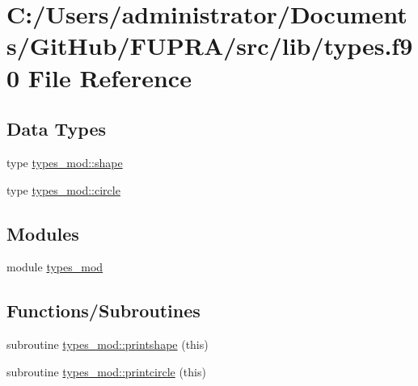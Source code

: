 \hypertarget{types_8f90}{}\section{C\+:/\+Users/administrator/\+Documents/\+Git\+Hub/\+F\+U\+P\+R\+A/src/lib/types.f90 File Reference}
\label{types_8f90}
\subsection*{Data Types}
\begin{DoxyCompactItemize}
\item 
type \mbox{\hyperlink{structtypes__mod_1_1shape}{types\+\_\+mod\+::shape}}
\item 
type \mbox{\hyperlink{structtypes__mod_1_1circle}{types\+\_\+mod\+::circle}}
\end{DoxyCompactItemize}
\subsection*{Modules}
\begin{DoxyCompactItemize}
\item 
module \mbox{\hyperlink{namespacetypes__mod}{types\+\_\+mod}}
\end{DoxyCompactItemize}
\subsection*{Functions/\+Subroutines}
\begin{DoxyCompactItemize}
\item 
subroutine \mbox{\hyperlink{namespacetypes__mod_ab09448209b0b127b46bc8fa8bf29b739}{types\+\_\+mod\+::printshape}} (this)
\item 
subroutine \mbox{\hyperlink{namespacetypes__mod_ae45a0e69dfbf27364378a9d1e7f71f99}{types\+\_\+mod\+::printcircle}} (this)
\end{DoxyCompactItemize}
